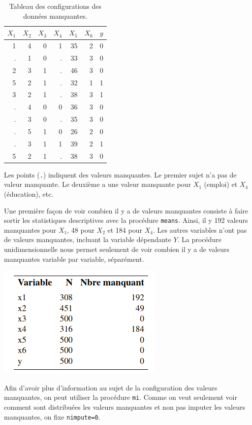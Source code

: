 \documentclass[
  11pt,
  letterpaper,
]{book}
\theoremstyle{definition}
\theoremstyle{definition}
\theoremstyle{definition}
\theoremstyle{remark}
\begin{document}
\begin{table}

\caption{\label{tab:missing1r}Tableau des configurations des données manquantes.}
\centering
\begin{tabular}[t]{rrrrrrr}
\toprule
$X_1$ & $X_2$ & $X_3$ & $X_4$ & $X_5$ & $X_6$ & $y$\\
\midrule
1 & 4 & 0 & 1 & 35 & 2 & 0\\
. & 1 & 0 & . & 33 & 3 & 0\\
2 & 3 & 1 & . & 46 & 3 & 0\\
5 & 2 & 1 & . & 32 & 1 & 1\\
3 & 2 & 1 & . & 38 & 3 & 1\\
\addlinespace
. & 4 & 0 & 0 & 36 & 3 & 0\\
. & 3 & 0 & . & 35 & 3 & 0\\
. & 5 & 1 & 0 & 26 & 2 & 0\\
. & 3 & 1 & 1 & 39 & 2 & 1\\
5 & 2 & 1 & . & 38 & 3 & 0\\
\bottomrule
\end{tabular}
\end{table}

Les points (\texttt{.}) indiquent des valeurs manquantes. Le premier sujet n'a pas de valeur manquante. Le deuxième a une valeur manquante pour \(X_1\) (emploi) et \(X_4\) (éducation), etc.

Une première façon de voir combien il y a de valeurs manquantes consiste à faire sortir les statistiques descriptives avec la procédure \texttt{means}.
Ainsi, il y 192 valeurs manquantes pour \(X_1\), 48 pour \(X_2\) et 184 pour \(X_4\). Les autres variables n'ont pas de valeurs manquantes, incluant la variable dépendante \(Y\). La procédure unidimensionnelle nous permet seulement de voir combien il y a de valeurs manquantes variable par variable, séparément.

\begin{center}\includegraphics[width=0.35\linewidth]{figures/06-manquantes-e1} \end{center}

Afin d'avoir plus d'information au sujet de la configuration des valeurs manquantes, on peut utiliser la procédure \texttt{mi}. Comme on veut seulement voir comment sont distribuées les valeurs manquantes et non pas imputer les valeurs manquantes, on fixe \texttt{nimpute=0}.
\end{document}
